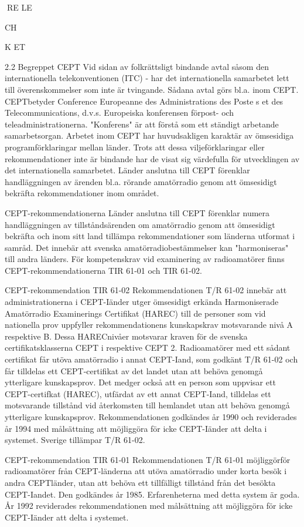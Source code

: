 \documentclass[a4paper,twoside,twocolumn,openright]{book}
\begin{document}
{{{{{RE LE

CH

K ET

2.2
Begreppet CEPT
Vid sidan av folkrättsligt bindande avtal såsom den internationella telekonventionen
(ITC) - har det internationella samarbetet
lett till överenskommelser som inte är tvingande. Sådana avtal görs bl.a. inom CEPT.
CEPTbetyder Conference Europeanne des
Administrations des Poste s et des Telecommunications, d.v.s. Europeiska konferensen
förpost- och teleadministrationerna. "Konferens" är att förstå som ett ständigt arbetande
samarbetsorgan.
Arbetet inom CEPT har huvudsakligen
karaktär av ömsesidiga programförklaringar
mellan länder. Trots att dessa viljeförklaringar
eller rekommendationer inte är bindande har
de visat sig värdefulla för utvecklingen av det
internationella samarbetet.
Länder anslutna till CEPT förenklar handläggningen av ärenden bl.a. rörande amatörradio genom att ömsesidigt bekräfta
rekommendationer inom området.

CEPT-rekommendationerna
Länder anslutna till CEPT förenklar numera
handläggningen av tillståndsärenden om
amatörradio genom att ömsesidigt bekräfta
och inom sitt land tillämpa rekommendationer som länderna utformat i samråd. Det
innebär att svenska amatörradiobestämmelser kan "harmoniseras" till andra länders.
För kompetenskrav vid examinering av radioamatörer finns CEPT-rekommendationerna TIR 61-01 och TIR 61-02.

CEPT-rekommendation TIR 61-02
Rekommendationen T/R 61-02 innebär att
administrationerna i CEPT-Iänder utger ömsesidigt erkända Harmoniserade Amatörradio Examinerings Certifikat (HAREC) till de
personer som vid nationella prov uppfyller
rekommendationens kunskapskrav motsvarande nivå A respektive B. Dessa HARECnivåer motsvarar kraven för de svenska certifikatsklasserna CEPT i respektive CEPT
2. Radioamatörer med ett sådant certifikat
får utöva amatörradio i annat CEPT-Iand,
som godkänt T/R 61-02 och får tilldelas ett
CEPT-certifikat av det landet utan att behöva genomgå ytterligare kunskapsprov.
Det medger också att en person som
uppvisar ett CEPT-certifkat (HAREC), utfärdat av ett annat CEPT-Iand, tilldelas ett
motsvarande tillstånd vid återkomsten till
hemlandet utan att behöva genomgå ytterligare kunskapsprov.
Rekommendationen godkändes år 1990
och reviderades år 1994 med målsättning
att möjliggöra för icke CEPT-Iänder att delta
i systemet.
Sverige tillämpar T/R 61-02.

CEPT-rekommendation TIR 61-01
Rekommendationen T/R 61-01 möjliggörför
radioamatörer från CEPT-länderna att utöva
amatörradio under korta besök i andra CEPTländer, utan att behöva ett tillfälligt tillstånd
från det besökta CEPT-Iandet. Den godkändes år 1985. Erfarenheterna med detta system är goda. År 1992 reviderades rekommendationen med målsättning att möjliggöra för icke CEPT-Iänder att delta i systemet.

}}}}}
\end{document}
